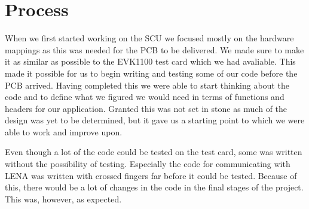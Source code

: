 \section{Process}
When we first started working on the \ac{SCU} we focused mostly on the hardware mappings as this was needed for the \ac{PCB} to be delivered. We made sure to make it as similar as possible to the EVK1100 test card which we had avaliable. This made it possible for us to begin writing and testing some of our code before the \ac{PCB} arrived. Having completed this we were able to start thinking about the code and to define what we figured we would need in terms of functions and headers for our application. Granted this was not set in stone as much of the design was yet to be determined, but it gave us a starting point to which we were able to work and improve upon.

Even though a lot of the code could be tested on the test card, some was written without the possibility of testing. Especially the code for communicating with \ac{LENA} was written with crossed fingers far before it could be tested. Because of this, there would be a lot of changes in the code in the final stages of the project. This was, however, as expected.
